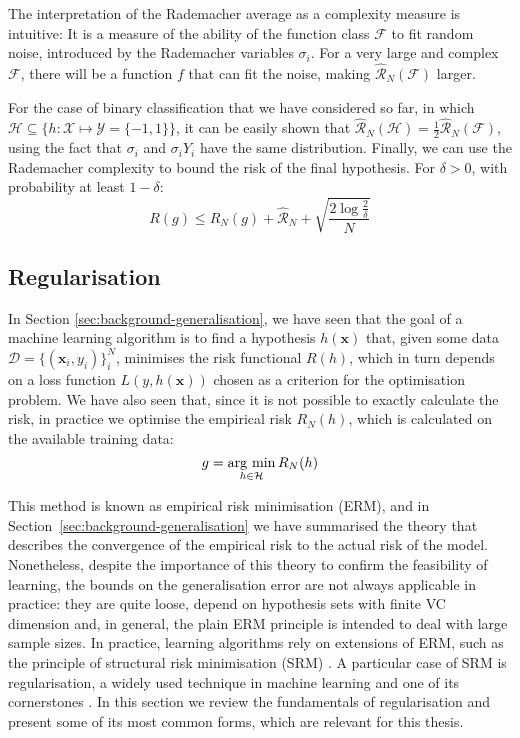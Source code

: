 {The interpretation of the Rademacher average as a complexity measure is intuitive: It is a measure of the ability of the function class $\mathcal{F}$ to fit random noise, introduced by the Rademacher variables $\sigma_i$. For a very large and complex $\mathcal{F}$, there will be a function $f$ that can fit the noise, making $\hat{\mathcal{R}}_{N}(\mathcal{F})$ larger. 

For the case of binary classification that we have considered so far, in which $\mathcal{H} \subseteq \{h \colon \mathcal{X} \mapsto \mathcal{Y} = \{-1, 1\}\}$, it can be easily shown that $\hat{\mathcal{R}}_{N}(\mathcal{H}) = \frac{1}{2}\hat{\mathcal{R}}_{N}(\mathcal{F})$, using the fact that $\sigma_i$ and $\sigma_i Y_i$ have the same distribution. Finally, we can use the Rademacher complexity to bound the risk of the final hypothesis. For $\delta > 0$,  with probability at least $1 - \delta$:
%
\begin{equation}
\label{eq:background-rademacher_risk}
    R(g) \leq R_{N}(g) + \hat{\mathcal{R}}_{N} + \sqrt{\frac{2\log\frac{2}{\delta}}{N}}
\end{equation}

\subsection{Regularisation}
\label{sec:background-regularisation}
In Section \ref{sec:background-generalisation}, we have seen that the goal of a machine learning algorithm is to find a hypothesis $h(\mathbf{x})$ that, given some data $\mathcal{D} = \{(\mathbf{x}_{i}, y_{i})\}_{i}^{N}$, minimises the risk functional $R(h)$, which in turn depends on a loss function $L(y, h(\mathbf{x}))$ chosen as a criterion for the optimisation problem. We have also seen that, since it is not possible to exactly calculate the risk, in practice we optimise the empirical risk $R_{N}(h)$, which is calculated on the available training data:
%
\begin{equation}
\label{eq:background-argmin_empirical_risk}
    g = \argmin_{h \in \mathcal{H}} R_{N}(h)
\end{equation}

This method is known as empirical risk minimisation (ERM), and in Section~\ref{sec:background-generalisation} we have summarised the theory that describes the convergence of the empirical risk to the actual risk of the model. Nonetheless, despite the importance of this theory to confirm the feasibility of learning, the bounds on the generalisation error are not always applicable in practice: they are quite loose, depend on hypothesis sets with finite VC dimension and, in general, the plain ERM principle is intended to deal with large sample sizes. In practice, learning algorithms rely on extensions of ERM, such as the principle of structural risk minimisation (SRM) \citep{vapnik1974srm}. A particular case of SRM is regularisation, a widely used technique in machine learning and one of its cornerstones \citep{poggio1990regularisation, girosi1995regularization}. In this section we review the fundamentals of regularisation and present some of its most common forms, which are relevant for this thesis.

}

